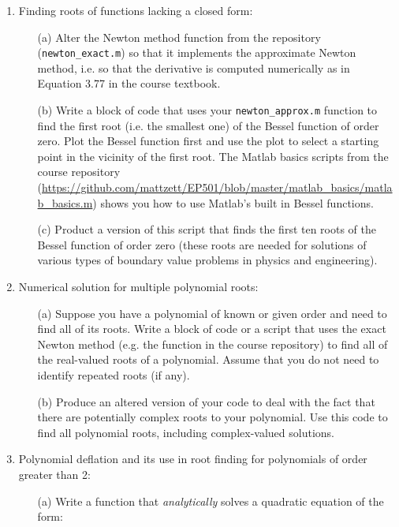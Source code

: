 \documentclass{article}
\begin{document}
\pagebreak

\begin{enumerate}
  \item Finding roots of functions lacking a closed form:  
  \begin{itemize}
    \item[(a)]  Alter the Newton method function from the repository (\texttt{newton\_exact.m}) so that it implements the approximate Newton method, i.e. so that the derivative is computed numerically as in Equation 3.77 in the course textbook.  
    \item[(b)]  Write a block of code that uses your \texttt{newton\_approx.m} function to find the first root (i.e. the smallest one) of the Bessel function of order zero.  Plot the Bessel function first and use the plot to select a starting point in the vicinity of the first root.  The Matlab basics scripts from the course repository (\url{https://github.com/mattzett/EP501/blob/master/matlab_basics/matlab_basics.m}) shows you how to use Matlab's built in Bessel functions.   
    \item[(c)]  Product a version of this script that finds the first ten roots of the Bessel function of order zero (these roots are needed for solutions of various types of boundary value problems in physics and engineering).    
  \end{itemize} 
  \item Numerical solution for multiple polynomial roots:
  \begin{itemize}
    \item[(a)]  Suppose you have a polynomial of known or given order and need to find all of its roots.  Write a block of code or a script that uses the exact Newton method (e.g. the function in the course repository) to find all of the real-valued roots of a polynomial.  Assume that you do not need to identify repeated roots (if any).
    \item[(b)]  Produce an altered version of your code to deal with the fact that there are potentially complex roots to your polynomial.  Use this code to find all polynomial roots, including complex-valued solutions.  
  \end{itemize}
  \item Polynomial deflation and its use in root finding for polynomials of order greater than 2:  
  \begin{itemize}
    \item[(a)]  Write a function that \emph{analytically} solves a quadratic equation of the form:
    \begin{equation}

\end{equation}
\end{itemize}
\end{enumerate}
\end{document}
